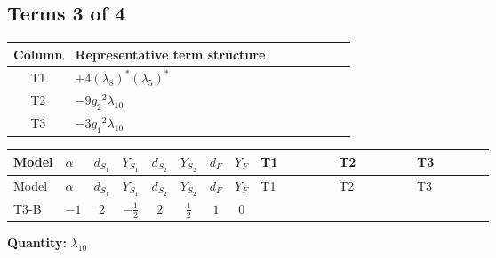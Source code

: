\documentclass[8pt]{article}
\begin{document}
\begin{landscape}
\subsection*{Terms 3 of 4}
\begin{center}
\begin{tabular}{@{}c >{\raggedright\arraybackslash}p{0.82\linewidth}@{}}
\toprule
Column & Representative term structure \\
\midrule
T1 & \(\displaystyle +4 \left({\lambda_{8}}\right)^{*} \left({\lambda_5}\right)^{*}\) \\
\midrule
T2 & \(\displaystyle -9 {g_2}^2 {\lambda_{10}}\) \\
\midrule
T3 & \(\displaystyle -3 {g_1}^2 {\lambda_{10}}\) \\
\midrule
\bottomrule
\end{tabular}
\end{center}
\smallskip
\tiny
\begin{longtable}{@{}llcccccc >{\raggedright\arraybackslash}p{0.21\linewidth} >{\raggedright\arraybackslash}p{0.21\linewidth} >{\raggedright\arraybackslash}p{0.21\linewidth}@{}}
\toprule
Model & $\alpha$ & $d_{S_1}$ & $Y_{S_1}$ & $d_{S_2}$ & $Y_{S_2}$ & $d_F$ & $Y_F$ & T1 & T2 & T3 \\
\midrule
\endfirsthead
\toprule
Model & $\alpha$ & $d_{S_1}$ & $Y_{S_1}$ & $d_{S_2}$ & $Y_{S_2}$ & $d_F$ & $Y_F$ & T1 & T2 & T3 \\
\midrule
\endhead
T3-B & $-1$ & $2$ & $-\frac{1}{2}$ & $2$ & $\frac{1}{2}$ & $1$ & $0$ & \scriptsize\adjustbox{max width=\linewidth}{$\begin{gathered} +4 \left({\lambda_{8}}\right)^{*} \left({\lambda_5}\right)^{*}\end{gathered}$} & \scriptsize\adjustbox{max width=\linewidth}{$\begin{gathered} -9 {g_2}^2 {\lambda_{10}}\end{gathered}$} & \scriptsize\adjustbox{max width=\linewidth}{$\begin{gathered} -3 {g_1}^2 {\lambda_{10}}\end{gathered}$} \\
\midrule
\bottomrule
\end{longtable}
\clearpage
\noindent\textbf{Quantity: }$\lambda_{10}$\par\smallskip

\end{landscape}
\end{document}
